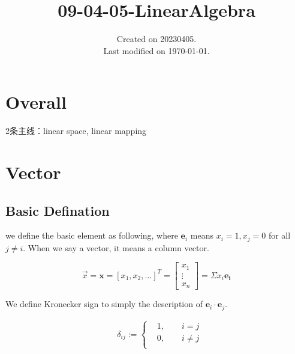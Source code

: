 \documentclass[UTF8]{../../09-Mathematics}
\begin{document}
\title{09-04-05-LinearAlgebra}
\date{Created on 20230405.\\   Last modified on \today.}
\maketitle
\tableofcontents


\chapter{Overall}



2条主线：linear space, linear mapping








\chapter{Vector}


\section{Basic Defination}

we define the basic element as following, where $ \boldsymbol e_i $ means $x_i = 1, x_j = 0$ for all $j \neq i$. When we say a vector, it means a column vector.

\begin{equation}
\vec{x}  = \boldsymbol x = [x_1, x_2,\dots]^T
= \begin{bmatrix}
    x_1 \\
    \vdots \\
    x_n
\end{bmatrix}
= \Sigma x_i \boldsymbol{e_i} 
\end{equation}

We define Kronecker sign to simply the description of $\boldsymbol e_i \cdot \boldsymbol e_j $.

\begin{equation}
    \begin{split}
    &\delta _{ij}:=
    \begin{cases}
    &1,\qquad i = j\\
    &0,\qquad i \neq j\\
    \end{cases}\\
    \end{split}
\end{equation}
\end{document}
